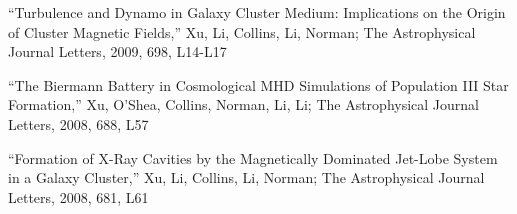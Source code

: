 \medskip
\noindent ``Turbulence and Dynamo in Galaxy Cluster Medium: Implications on the Origin of Cluster Magnetic Fields,''
Xu, Li, Collins, Li, Norman;
The Astrophysical Journal Letters,
 2009,
698,
L14-L17

\medskip
\noindent ``The Biermann Battery in Cosmological MHD Simulations of Population III Star Formation,''
Xu, O'Shea, Collins, Norman, Li, Li;
The Astrophysical Journal Letters,
 2008,
688,
L57

\medskip
\noindent ``Formation of X-Ray Cavities by the Magnetically Dominated Jet-Lobe System in a Galaxy Cluster,''
Xu, Li, Collins, Li, Norman;
The Astrophysical Journal Letters,
 2008,
681,
L61
